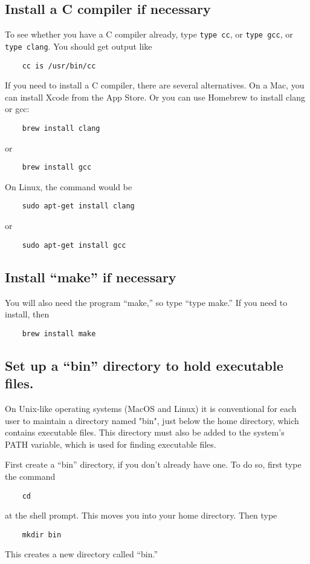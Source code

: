 \documentclass[11pt]{article}
\begin{document}
\subsection{Install a C compiler if necessary}
To see whether you have a C compiler already, type \texttt{type cc},
or \texttt{type gcc}, or \texttt{type clang}. You should get output like
\begin{verbatim}
    cc is /usr/bin/cc
\end{verbatim}
If you need to install a C compiler, there are several
alternatives. On a Mac, you can install Xcode from the App Store. Or
you can use Homebrew to install clang or gcc:
\begin{verbatim}
    brew install clang
\end{verbatim}
or
\begin{verbatim}
    brew install gcc
\end{verbatim}
On Linux, the command would be
\begin{verbatim}
    sudo apt-get install clang
\end{verbatim}
or
\begin{verbatim}
    sudo apt-get install gcc
\end{verbatim}

\subsection{Install ``make'' if necessary}
You will also need the program ``make,'' so type ``type make.'' If you
need to install, then
\begin{verbatim}
    brew install make
\end{verbatim}

\subsection{Set up a ``bin'' directory to hold executable files.}
On Unix-like operating systems (MacOS and Linux) it is conventional
for each user to maintain a directory named "bin", just below the home
directory, which contains executable files. This directory must also
be added to the system's PATH variable, which is used for finding
executable files.

First create a ``bin'' directory, if you don't already have one. To do
so, first type the command
\begin{verbatim}
    cd
\end{verbatim}
at the shell prompt. This moves you into your home directory. Then
type
\begin{verbatim}
    mkdir bin
\end{verbatim}
This creates a new directory called ``bin.''
\end{document}
